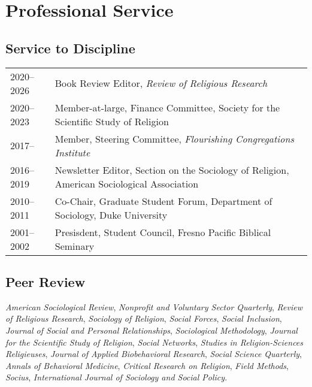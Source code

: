\section*{Professional Service}
\newcommand{\tabitem}{~~\llap{\textbullet}~~}
\subsection*{Service to Discipline}

\begin{tabular}{p{} p{}}
2020--2026 & Book Review Editor, \textit{Review of Religious Research}\\
2020--2023 & Member-at-large, Finance Committee, Society for the Scientific Study of Religion\\
2017-- & Member, Steering Committee, \textit{Flourishing Congregations Institute}\\
2016--2019 & Newsletter Editor, Section on the Sociology of Religion, American Sociological Association\\
2010--2011 & Co-Chair, Graduate Student Forum, Department of Sociology, Duke University\\
2001--2002 & Presisdent, Student Council, Fresno Pacific Biblical Seminary\\
\end{tabular}

\subsection*{Peer Review}

 \emph{American Sociological Review},
 \emph{Nonproﬁt and Voluntary Sector Quarterly},
 \emph{Review of Religious Research},
 \emph{Sociology of Religion},
 \emph{Social Forces},
 \emph{Social Inclusion},
 \emph{Journal of Social and Personal Relationships},
 \emph{Sociological Methodology},
 \emph{Journal for the Scientiﬁc Study of Religion},
 \emph{Social Networks},
 \emph{Studies in Religion-Sciences Religieuses},
 \emph{Journal of Applied Biobehavioral Research},
 \emph{Social Science Quarterly},
 \emph{Annals of Behavioral Medicine},
 \emph{Critical Research on Religion},
 \emph{Field Methods},
 \emph{Socius},
 \emph{International Journal of Sociology and Social Policy}.
